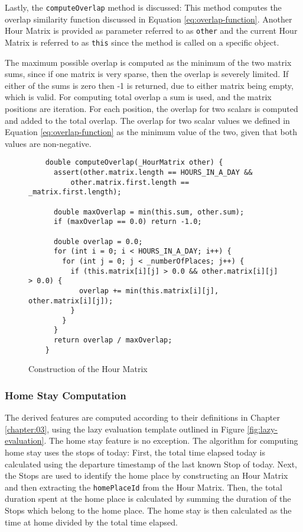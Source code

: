 Lastly, the \verb|computeOverlap| method is discussed: This method computes the overlap similarity function discussed in Equation \eqref{eq:overlap-function}. Another Hour Matrix is provided as parameter referred to as \verb|other| and the current Hour Matrix is referred to as \verb|this| since the method is called on a specific object. 

The maximum possible overlap is computed as the minimum of the two matrix sums, since if one matrix is very sparse, then the overlap is severely limited. If either of the sums is zero then -1 is returned, due to either matrix being empty, which is valid. For computing total overlap a sum is used, and the matrix positions are iteration. For each position, the overlap for two scalars is computed and added to the total overlap. The overlap for two scalar values we defined in Equation \eqref{eq:overlap-function} as the minimum value of the two, given that both values are non-negative. 

\begin{figure}
    \centering
    \begin{verbatim}
    double computeOverlap(_HourMatrix other) {
      assert(other.matrix.length == HOURS_IN_A_DAY &&
          other.matrix.first.length == _matrix.first.length);
    
      double maxOverlap = min(this.sum, other.sum);
      if (maxOverlap == 0.0) return -1.0;
    
      double overlap = 0.0;
      for (int i = 0; i < HOURS_IN_A_DAY; i++) {
        for (int j = 0; j < _numberOfPlaces; j++) {
          if (this.matrix[i][j] > 0.0 && other.matrix[i][j] > 0.0) {
            overlap += min(this.matrix[i][j], other.matrix[i][j]);
          }
        }
      }
      return overlap / maxOverlap;
    }
    \end{verbatim}
    \caption{Construction of the Hour Matrix}
    \label{fig:hour-matrix-overlap}
\end{figure}


\subsubsection*{Home Stay Computation}
The derived features are computed according to their definitions in Chapter \ref{chapter:03}, using the lazy evaluation template outlined in Figure \ref{fig:lazy-evaluation}. The home stay feature is no exception. The algorithm for computing home stay uses the stops of today: First, the total time elapsed today is calculated using the departure timestamp of the last known Stop of today. Next, the Stops are used to identify the home place by constructing an Hour Matrix and then extracting the \verb|homePlaceId| from the Hour Matrix. Then, the total duration spent at the home place is calculated by summing the duration of the Stops which belong to the home place. The home stay is then calculated as the time at home divided by the total time elapsed.


